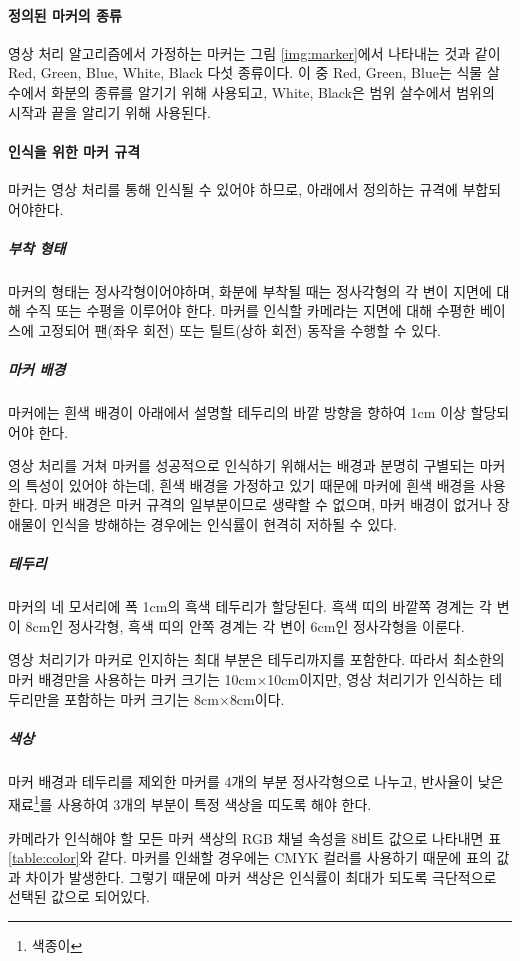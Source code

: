 \documentclass[chapter,11pt,oneside,openany]{xoblivoir}
\begin{document}
\paragraph{정의된 마커의 종류}
영상 처리 알고리즘에서 가정하는 마커는 그림 \ref{img:marker}에서 나타내는 것과 같이
Red, Green, Blue, White, Black 다섯 종류이다.
이 중 Red, Green, Blue는 식물 살수에서 화분의 종류를 알기기 위해 사용되고,
White, Black은 범위 살수에서 범위의 시작과 끝을 알리기 위해 사용된다.

\paragraph{인식을 위한 마커 규격}
마커는 영상 처리를 통해 인식될 수 있어야 하므로, 아래에서 정의하는 규격에 부합되어야한다.

\subparagraph{부착 형태}
마커의 형태는 정사각형이어야하며, 화분에 부착될 때는 정사각형의 각 변이 지면에 대해 수직 또는 수평을 이루어야 한다.
마커를 인식할 카메라는 지면에 대해 수평한 베이스에 고정되어 팬(좌우 회전) 또는 틸트(상하 회전) 동작을 수행할 수 있다.

\subparagraph{마커 배경}
마커에는 흰색 배경이 아래에서 설명할 테두리의 바깥 방향을 향하여 1cm 이상 할당되어야 한다.

영상 처리를 거쳐 마커를 성공적으로 인식하기 위해서는 배경과 분명히 구별되는 마커의 특성이 있어야 하는데,
흰색 배경을 가정하고 있기 때문에 마커에 흰색 배경을 사용한다.
마커 배경은 마커 규격의 일부분이므로 생략할 수 없으며, 마커 배경이 없거나 장애물이 인식을 방해하는 경우에는
인식률이 현격히 저하될 수 있다.

\subparagraph{테두리}
마커의 네 모서리에 폭 1cm의 흑색 테두리가 할당된다. 흑색 띠의 바깥쪽 경계는 각 변이 8cm인 정사각형,
흑색 띠의 안쪽 경계는 각 변이 6cm인 정사각형을 이룬다.

영상 처리기가 마커로 인지하는 최대 부분은 테두리까지를 포함한다.
따라서 최소한의 마커 배경만을 사용하는 마커 크기는 10cm$\times$10cm이지만,
영상 처리기가 인식하는 테두리만을 포함하는 마커 크기는 8cm$\times$8cm이다.

\subparagraph{색상}
마커 배경과 테두리를 제외한 마커를 4개의 부분 정사각형으로 나누고, 반사율이 낮은 재료\footnote{색종이}를 사용하여
3개의 부분이 특정 색상을 띠도록 해야 한다.

카메라가 인식해야 할 모든 마커 색상의 RGB 채널 속성을 8비트 값으로 나타내면 표 \ref{table:color}와 같다.
마커를 인쇄할 경우에는 CMYK 컬러를 사용하기 때문에 표의 값과 차이가 발생한다.
그렇기 때문에 마커 색상은 인식률이 최대가 되도록 극단적으로 선택된 값으로 되어있다.
\end{document}

